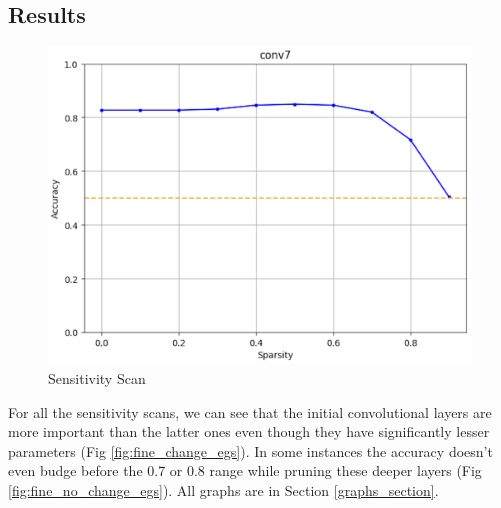 \documentclass[12pt]{article}
\begin{document}
\subsection{Results}
\begin{figure}[h]
  \centering
  \includegraphics[width=0.4\linewidth]{report_images/fine_sense_egs.png}
  \caption{\label{fig:fine_sense_egs}Sensitivity Scan}
\end{figure}
\noindent
For all the sensitivity scans, we can see that the initial convolutional layers are more important than the latter ones even though they have significantly lesser parameters (Fig \ref{fig:fine_change_egs}). In some instances the accuracy doesn't even budge before the 0.7 or 0.8 range while pruning these deeper layers (Fig \ref{fig:fine_no_change_egs}). All graphs are in Section \ref{graphs_section}.
\end{document}
